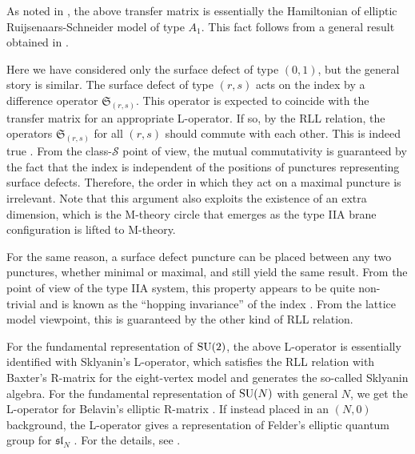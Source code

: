 As noted in \cite{Gaiotto:2012xa}, the above transfer matrix
is essentially the Hamiltonian of elliptic Ruijsenaars-Schneider model
\cite{MR851627,Ruijsenaars:1986pp} of type $A_{1}$. This fact
follows from a general result obtained in \cite{MR1463830}.

Here we have considered only the surface defect of type $(0,1)$,
but the general story is similar. The surface defect of type $(r,s)$
acts on the index by a difference operator $\mathfrak{S}_{(r,s)}$.
This operator is expected to coincide with the transfer matrix for
an appropriate L-operator. If so, by the RLL relation, the operators
$\mathfrak{S}_{(r,s)}$ for all $(r,s)$ should commute with each
other. This is indeed true \cite{Gaiotto:2012xa}. From the class-$\mathcal{S}$
point of view, the mutual commutativity is guaranteed by the fact
that the index is independent of the positions of punctures representing
surface defects. Therefore, the order in which they act on a maximal
puncture is irrelevant. Note that this argument also exploits the
existence of an extra dimension, which is the M-theory circle that
emerges as the type IIA brane configuration is lifted to M-theory.

For the same reason, a surface defect puncture can be placed between
any two punctures, whether minimal or maximal, and still yield the
same result. From the point of view of the type IIA system, this property
appears to be quite non-trivial and is known as the ``hopping invariance''
of the index \cite{Gadde:2013dda}. From the lattice model viewpoint,
this is guaranteed by the other kind of RLL relation.


For the fundamental representation of $\mathrm{SU}(2)$, the above L-operator
is essentially identified with Sklyanin's L-operator, which satisfies
the RLL relation with Baxter's R-matrix for the eight-vertex model
and generates the so-called Sklyanin algebra. For the fundamental
representation of $\mathrm{SU}(N)$ with general $N$, we get the L-operator
for Belavin's elliptic R-matrix \cite{Belavin:1981ix}. If instead placed in
an $\left( N,0 \right)$ background, the L-operator gives a representation
of Felder's elliptic quantum group for $\mathfrak{sl}_{N}$ \cite{Felder:1994pb,Felder:1994be,MR1606760}.
For the
details, see \cite{Yagi:2017hmj}.










